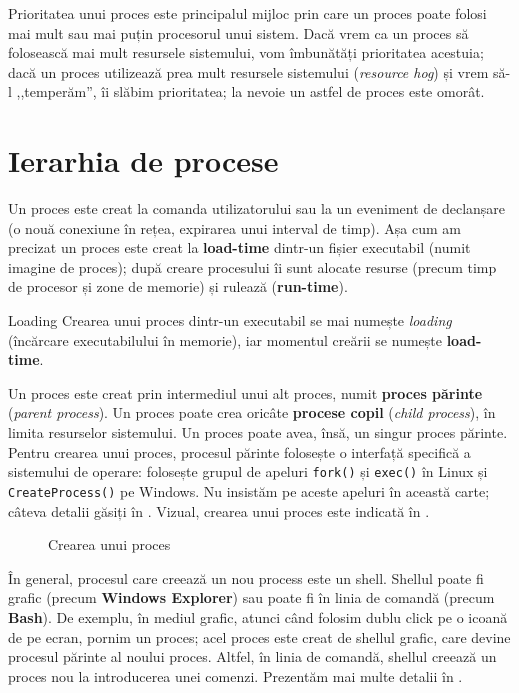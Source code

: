 Prioritatea unui proces este principalul mijloc prin care un proces poate folosi mai mult sau mai puțin procesorul unui sistem.
Dacă vrem ca un proces să folosească mai mult resursele sistemului, vom îmbunătăți prioritatea acestuia;
dacă un proces utilizează prea mult resursele sistemului (\textit{resource hog}) și vrem să-l ,,temperăm'', îi slăbim prioritatea;
la nevoie un astfel de proces este omorât.

\section{Ierarhia de procese}
\label{sec:process:hierarhy}

Un proces este creat la comanda utilizatorului sau la un eveniment de declanșare (o nouă conexiune în rețea, expirarea unui interval de timp).
Așa cum am precizat un proces este creat la \textbf{load-time} dintr-un fișier executabil (numit imagine de proces);
după creare procesului îi sunt alocate resurse (precum timp de procesor și zone de memorie) și rulează (\textbf{run-time}).

\begin{definition}{Loading}
  Crearea unui proces dintr-un executabil se mai numește \textit{loading} (încărcare executabilului în memorie), iar momentul creării se numește \textbf{load-time}.
\end{definition}

Un proces este creat prin intermediul unui alt proces, numit \textbf{proces părinte} (\textit{parent process}).
Un proces poate crea oricâte \textbf{procese copil} (\textit{child process}), în limita resurselor sistemului.
Un proces poate avea, însă, un singur proces părinte.
Pentru crearea unui proces, procesul părinte folosește o interfață specifică a sistemului de operare: folosește grupul de apeluri \texttt{fork()} și \texttt{exec()} în Linux și \texttt{CreateProcess()} pe Windows.
Nu insistăm pe aceste apeluri în această carte;
câteva detalii găsiți în .
Vizual, crearea unui proces este indicată în .

\begin{figure}[!htbp]
  \centering
  \def\svgwidth{0.5\textwidth}
  
  \caption{Crearea unui proces}
  \label{fig:process:create}
\end{figure}

În general, procesul care creează un nou process este un shell.
Shellul poate fi grafic (precum \textbf{Windows Explorer}) sau poate fi în linia de comandă (precum \textbf{Bash}).
De exemplu, în mediul grafic, atunci când folosim dublu click pe o icoană de pe ecran, pornim un proces;
acel proces este creat de shellul grafic, care devine procesul părinte al noului proces.
Altfel, în linia de comandă, shellul creează un proces nou la introducerea unei comenzi.
Prezentăm mai multe detalii în .

